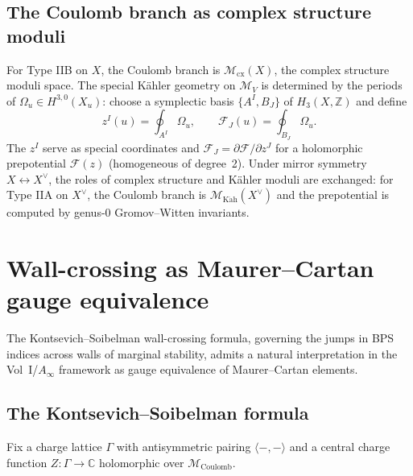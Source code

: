 \subsection{The Coulomb branch as complex structure moduli}
\label{subsec:phys-coulomb-cx-structure}

For Type IIB on $X$, the Coulomb branch is $\mathcal{M}_{\mathrm{cx}}(X)$, the
complex structure moduli space. The special K\"{a}hler geometry on
$\mathcal{M}_V$ is determined by the periods of $\Omega_u\in H^{3,0}(X_u)$:
choose a symplectic basis $\{A^I, B_J\}$ of $H_3(X, \mathbb{Z})$ and define
\begin{equation}\label{eq:phys-periods}
 z^I(u) = \oint_{A^I} \Omega_u, \qquad \mathcal{F}_J(u) = \oint_{B_J} \Omega_u.
\end{equation}
The $z^I$ serve as special coordinates and $\mathcal{F}_J = \partial\mathcal{F}/\partial z^J$
for a holomorphic prepotential $\mathcal{F}(z)$ (homogeneous of degree~2).
Under mirror symmetry $X \leftrightarrow X^\vee$, the roles of complex structure
and K\"{a}hler moduli are exchanged: for Type IIA on $X^\vee$, the Coulomb
branch is $\mathcal{M}_{\mathrm{K\ddot{a}h}}(X^\vee)$ and the prepotential is
computed by genus-0 Gromov--Witten invariants.


\section{Wall-crossing as Maurer--Cartan gauge equivalence}
\label{sec:phys-wall-crossing-mc}

The Kontsevich--Soibelman wall-crossing formula, governing the jumps in BPS
indices across walls of marginal stability, admits a natural interpretation in
the Vol~I/$A_\infty$ framework as gauge equivalence of Maurer--Cartan elements.

\subsection{The Kontsevich--Soibelman formula}
\label{subsec:phys-ks-formula}

Fix a charge lattice $\Gamma$ with antisymmetric pairing $\langle -, -\rangle$
and a central charge function $Z\colon \Gamma \to \mathbb{C}$ holomorphic over
$\mathcal{M}_{\mathrm{Coulomb}}$.

